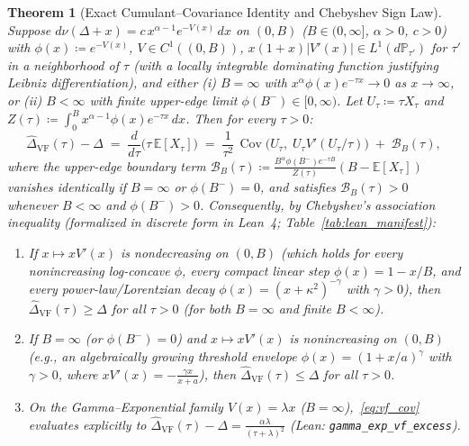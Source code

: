 \documentclass[11pt,a4paper]{article}
\newtheorem{theorem}{Theorem}[section]
\theoremstyle{definition}
\newcommand{\E}{\mathbb{E}}
\newcommand{\Cov}{\operatorname{Cov}}
\begin{document}
\begin{theorem}[Exact Cumulant--Covariance Identity and Chebyshev Sign Law]
\label{thm:vf_chebyshev}
Suppose $d\nu(\Delta + x) = c\, x^{\alpha - 1} e^{-V(x)}\, dx$ on $(0, B)$ ($B \in (0, \infty]$, $\alpha > 0$, $c > 0$) with $\phi(x) \coloneqq e^{-V(x)}$, $V \in C^1((0, B))$, $x(1 + x)|V'(x)| \in L^1(d\mathbb{P}_{\tau'})$ for $\tau'$ in a neighborhood of $\tau$ (with a locally integrable dominating function justifying Leibniz differentiation), and either (i) $B = \infty$ with $x^\alpha \phi(x) e^{-\tau x} \to 0$ as $x \to \infty$, or (ii) $B < \infty$ with finite upper-edge limit $\phi(B^-) \in [0, \infty)$. Let $U_\tau \coloneqq \tau X_\tau$ and $Z(\tau) \coloneqq \int_0^B x^{\alpha-1}\phi(x)e^{-\tau x}\,dx$. Then for \emph{every} $\tau > 0$:
\begin{equation}
  \widehat{\Delta}_{\mathrm{VF}}(\tau) - \Delta
  \;=\; \frac{d}{d\tau}\bigl(\tau\,\E[X_\tau]\bigr)
  \;=\; \frac{1}{\tau^2}\,\Cov\!\bigl(U_\tau,\; U_\tau V'(U_\tau / \tau)\bigr)
  \;+\; \mathcal{B}_B(\tau),
  \label{eq:vf_cov}
\end{equation}
where the upper-edge boundary term $\mathcal{B}_B(\tau) \coloneqq \frac{B^\alpha \phi(B^-) e^{-\tau B}}{Z(\tau)}(B - \E[X_\tau])$ vanishes identically if $B = \infty$ or $\phi(B^-) = 0$, and satisfies $\mathcal{B}_B(\tau) > 0$ whenever $B < \infty$ and $\phi(B^-) > 0$. Consequently, by Chebyshev's association inequality (formalized in discrete form in Lean~4; Table~\ref{tab:lean_manifest}):
\begin{enumerate}[label=(\alph*),leftmargin=2em,itemsep=2pt]
  \item If $x \mapsto x V'(x)$ is nondecreasing on $(0, B)$ (which holds for every nonincreasing log-concave $\phi$, every compact linear step $\phi(x) = 1 - x/B$, and every power-law/Lorentzian decay $\phi(x) = (x + \kappa^2)^{-\gamma}$ with $\gamma > 0$), then $\widehat{\Delta}_{\mathrm{VF}}(\tau) \ge \Delta$ for \emph{all} $\tau > 0$ (for both $B = \infty$ and finite $B < \infty$).
  \item If $B = \infty$ (or $\phi(B^-) = 0$) and $x \mapsto x V'(x)$ is nonincreasing on $(0, B)$ (e.g., an algebraically growing threshold envelope $\phi(x) = (1 + x/a)^\gamma$ with $\gamma > 0$, where $x V'(x) = -\frac{\gamma x}{x + a}$), then $\widehat{\Delta}_{\mathrm{VF}}(\tau) \le \Delta$ for \emph{all} $\tau > 0$.
  \item On the Gamma--Exponential family $V(x) = \lambda x$ ($B = \infty$),~\eqref{eq:vf_cov} evaluates explicitly to $\widehat{\Delta}_{\mathrm{VF}}(\tau) - \Delta = \frac{\alpha\lambda}{(\tau+\lambda)^2}$ (Lean: \texttt{gamma\_exp\_vf\_excess}).
\end{enumerate}
\end{theorem}
\end{document}
